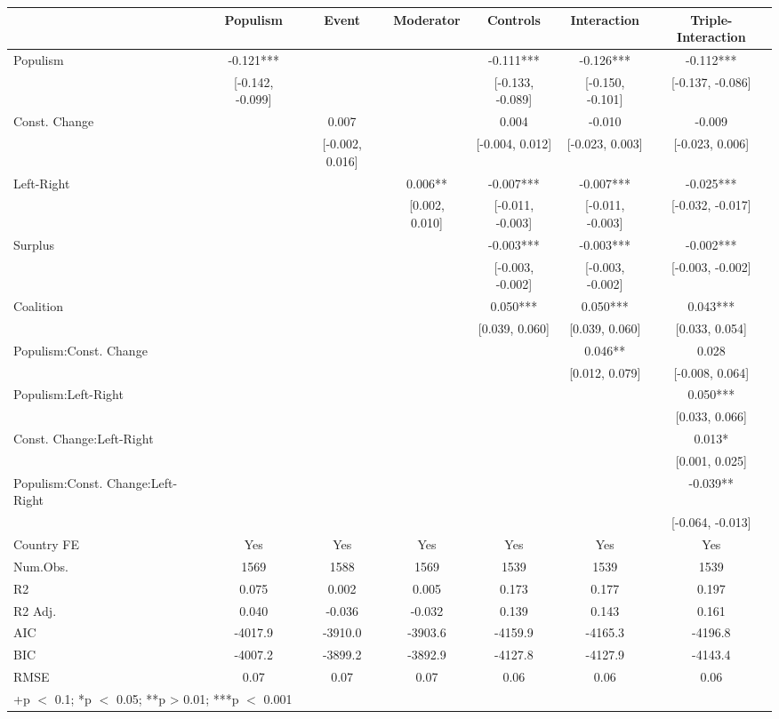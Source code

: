 \begin{table}
\centering\centering\centering
\begin{tabular}[t]{lcccccc}
\toprule
  & Populism & Event & Moderator & Controls & Interaction & Triple-Interaction\\
\midrule
Populism & -0.121*** &  &  & -0.111*** & -0.126*** & -0.112***\\
 & {}[-0.142, -0.099] &  &  & {}[-0.133, -0.089] & {}[-0.150, -0.101] & {}[-0.137, -0.086]\\
Const. Change &  & 0.007 &  & 0.004 & -0.010 & -0.009\\
 &  & {}[-0.002, 0.016] &  & {}[-0.004, 0.012] & {}[-0.023, 0.003] & {}[-0.023, 0.006]\\
Left-Right &  &  & 0.006** & -0.007*** & -0.007*** & -0.025***\\
 &  &  & {}[0.002, 0.010] & {}[-0.011, -0.003] & {}[-0.011, -0.003] & {}[-0.032, -0.017]\\
Surplus &  &  &  & -0.003*** & -0.003*** & -0.002***\\
 &  &  &  & {}[-0.003, -0.002] & {}[-0.003, -0.002] & {}[-0.003, -0.002]\\
Coalition &  &  &  & 0.050*** & 0.050*** & 0.043***\\
 &  &  &  & {}[0.039, 0.060] & {}[0.039, 0.060] & {}[0.033, 0.054]\\
Populism:Const. Change &  &  &  &  & 0.046** & 0.028\\
 &  &  &  &  & {}[0.012, 0.079] & {}[-0.008, 0.064]\\
Populism:Left-Right &  &  &  &  &  & 0.050***\\
 &  &  &  &  &  & {}[0.033, 0.066]\\
Const. Change:Left-Right &  &  &  &  &  & 0.013*\\
 &  &  &  &  &  & {}[0.001, 0.025]\\
Populism:Const. Change:Left-Right &  &  &  &  &  & -0.039**\\
 &  &  &  &  &  & {}[-0.064, -0.013]\\
\midrule
Country FE & Yes & Yes & Yes & Yes & Yes & Yes\\
Num.Obs. & 1569 & 1588 & 1569 & 1539 & 1539 & 1539\\
R2 & 0.075 & 0.002 & 0.005 & 0.173 & 0.177 & 0.197\\
R2 Adj. & 0.040 & -0.036 & -0.032 & 0.139 & 0.143 & 0.161\\
AIC & -4017.9 & -3910.0 & -3903.6 & -4159.9 & -4165.3 & -4196.8\\
BIC & -4007.2 & -3899.2 & -3892.9 & -4127.8 & -4127.9 & -4143.4\\
RMSE & 0.07 & 0.07 & 0.07 & 0.06 & 0.06 & 0.06\\
\bottomrule
\multicolumn{7}{l}{\rule{0pt}{1em}+p $<$ 0.1; *p $<$ 0.05; **p > 0.01; ***p $<$ 0.001}\\
\end{tabular}
\end{table}
